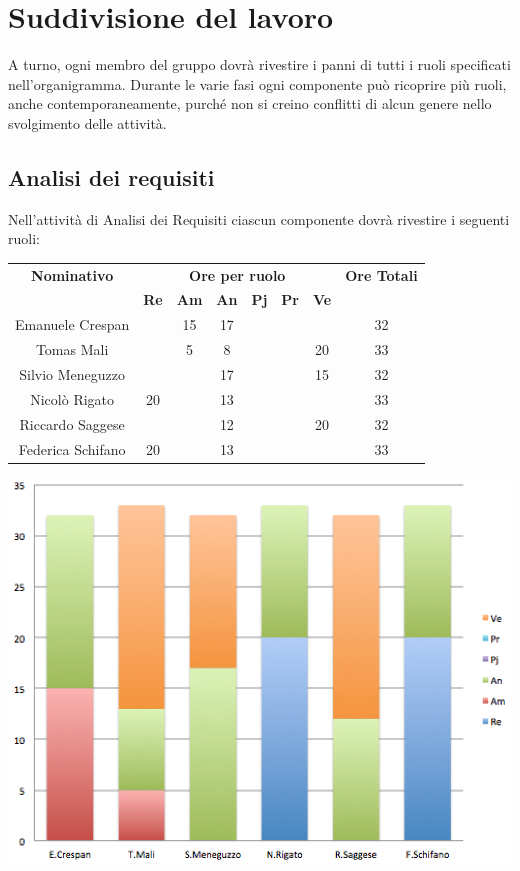 \section{Suddivisione del lavoro}
A turno, ogni membro del gruppo dovrà rivestire i panni di tutti i
ruoli specificati nell'organigramma. Durante le varie fasi
ogni componente può ricoprire più ruoli, anche contemporaneamente,
purché non si creino conflitti di alcun genere nello svolgimento delle
attività. 

\subsection{Analisi dei requisiti}
Nell'attività di Analisi dei Requisiti ciascun componente dovrà rivestire i seguenti ruoli:

\begin{center}
  \centering
  \begin{tabular} {|c|c|c|c|c|c|c|c|}
    \hline
    \textbf{Nominativo} & \multicolumn{6}{|c|}{\textbf{Ore per ruolo}} & \textbf{Ore Totali} \\
    & \textbf{Re} & \textbf{Am} & \textbf{An} & \textbf{Pj} & \textbf{Pr} & \textbf{Ve} & \\
    \hline
    Emanuele Crespan & & 15 & 17 & & & & 32\\
    \hline
    Tomas Mali &  & 5 & 8 & & & 20 & 33\\
    \hline
    Silvio Meneguzzo & & & 17 & & & 15 & 32\\
    \hline
    Nicolò Rigato & 20 & & 13 & & &  & 33\\
    \hline
    Riccardo Saggese & & & 12 & & & 20 & 32\\
    \hline
    Federica Schifano & 20 & & 13 & & & & 33\\
    \hline
  \end{tabular}
  \includegraphics[scale=0.65]{img/fig1.png}
\end{center}

